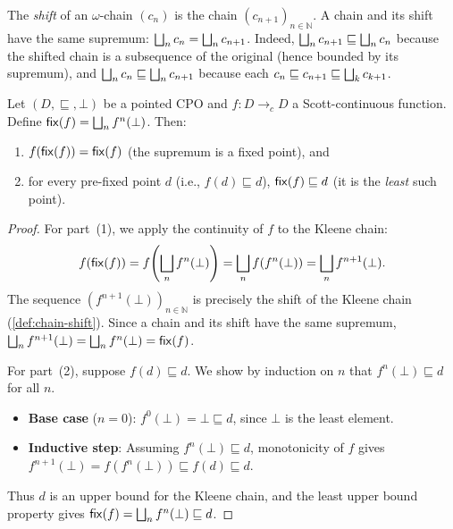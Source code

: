\begin{definition}
\label{def:chain-shift}
The \emph{shift} of an $\omega$-chain $(c_n)$ is the chain
$(c_{n+1})_{n \in \mathbb{N}}$. A chain and its shift have the same
supremum: $\bigsqcup_n c_n = \bigsqcup_n c_{n+1}$. Indeed,
$\bigsqcup_n c_{n+1} \sqsubseteq \bigsqcup_n c_n$ because the shifted chain is a
subsequence of the original (hence bounded by its supremum), and
$\bigsqcup_n c_n \sqsubseteq \bigsqcup_n c_{n+1}$ because each $c_n \sqsubseteq
c_{n+1} \sqsubseteq \bigsqcup_k c_{k+1}$.
\end{definition}

\begin{theorem}
\label{thm:kleene}
Let $(D, \sqsubseteq, \bot)$ be a pointed CPO and $f : D \to_{c} D$ a
Scott-continuous function. Define $\mathsf{fix}(f) = \bigsqcup_n f^n(\bot)$. Then:
\begin{enumerate}
  \item $f(\mathsf{fix}(f)) = \mathsf{fix}(f)$ \quad (the supremum is a fixed point), and
  \item for every pre-fixed point $d$ (i.e., $f(d) \sqsubseteq d$),
        $\mathsf{fix}(f) \sqsubseteq d$ \quad (it is the \emph{least} such point).
\end{enumerate}
\end{theorem}

\begin{proof}
For part~(1), we apply the continuity of $f$ to the Kleene chain:
\[
  f(\mathsf{fix}(f))
  = f\!\left(\bigsqcup_n f^n(\bot)\right)
  = \bigsqcup_n f(f^n(\bot))
  = \bigsqcup_n f^{n+1}(\bot).
\]
The sequence $(f^{n+1}(\bot))_{n \in \mathbb{N}}$ is precisely the shift
of the Kleene chain (\cref{def:chain-shift}). Since a chain and its shift
have the same supremum, $\bigsqcup_n f^{n+1}(\bot) = \bigsqcup_n f^n(\bot) =
\mathsf{fix}(f)$.

For part~(2), suppose $f(d) \sqsubseteq d$. We show by induction on $n$
that $f^n(\bot) \sqsubseteq d$ for all $n$.
\begin{itemize}
  \item \textbf{Base case} ($n = 0$): $f^0(\bot) = \bot \sqsubseteq d$,
        since $\bot$ is the least element.
  \item \textbf{Inductive step}: Assuming $f^n(\bot) \sqsubseteq d$,
        monotonicity of $f$ gives $f^{n+1}(\bot) = f(f^n(\bot))
        \sqsubseteq f(d) \sqsubseteq d$.
\end{itemize}
Thus $d$ is an upper bound for the Kleene chain, and the least upper
bound property gives $\mathsf{fix}(f) = \bigsqcup_n f^n(\bot) \sqsubseteq d$.
\end{proof}

